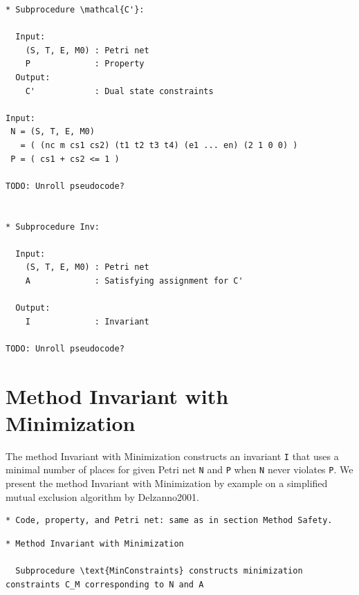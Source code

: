 \documentclass{article}
\begin{document}
\newpage
\begin{verbatim}
* Subprocedure \mathcal{C'}:

  Input:
    (S, T, E, M0) : Petri net
    P             : Property
  Output:
    C'            : Dual state constraints

Input:
 N = (S, T, E, M0)
   = ( (nc m cs1 cs2) (t1 t2 t3 t4) (e1 ... en) (2 1 0 0) )
 P = ( cs1 + cs2 <= 1 )

TODO: Unroll pseudocode?


* Subprocedure Inv:

  Input:
    (S, T, E, M0) : Petri net
    A             : Satisfying assignment for C'

  Output:
    I             : Invariant

TODO: Unroll pseudocode?
\end{verbatim}

\newpage
\section{Method Invariant with Minimization}

The method Invariant with Minimization constructs an invariant \verb=I=
that uses a minimal number of places for given Petri net \verb=N= and
\verb=P= when \verb=N= never violates \verb=P=. 
We present the method Invariant with Minimization by example on a
simplified mutual exclusion algorithm by Delzanno2001.

\begin{verbatim}
* Code, property, and Petri net: same as in section Method Safety.
\end{verbatim}

\begin{verbatim}
* Method Invariant with Minimization

  Subprocedure \text{MinConstraints} constructs minimization constraints C_M corresponding to N and A
\end{verbatim}
\end{document}
